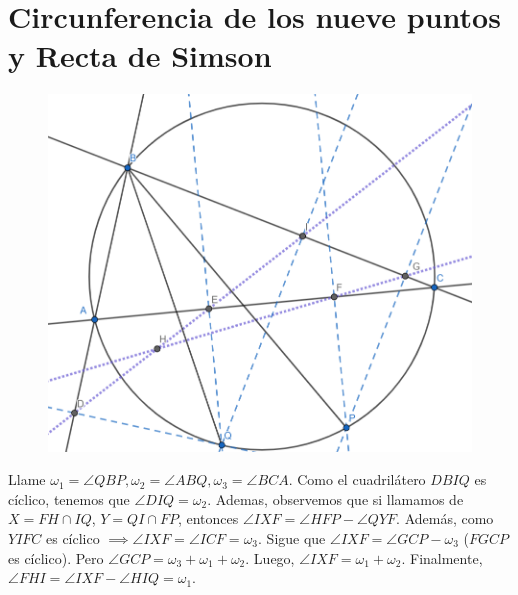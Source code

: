 \section{Circunferencia de los nueve puntos y Recta de Simson}

\begin{sol}
	
	\begin{figure}[h!]
		\centering
		\includegraphics[scale=0.4]{Imgs/JT5.png}
	\end{figure}
	Llame $\omega_{1} = \angle QBP, \omega_{2} = \angle ABQ, \omega_{3} = \angle BCA$. Como el cuadril\'atero $DBIQ$ es c\'iclico, tenemos que $\angle DIQ = \omega_{2}$. Ademas, observemos que si llamamos de $X = FH \cap IQ$, $Y = QI \cap FP$, entonces $\angle IXF = \angle HFP - \angle QYF$. Adem\'as, como $YIFC$ es c\'iclico $\implies \angle IXF = \angle ICF = \omega_{3}$. Sigue que $\angle IXF = \angle GCP - \omega_{3}$ ($FGCP$ es c\'iclico). Pero $\angle GCP = \omega_{3} + \omega_{1} + \omega_{2}$. Luego, $\angle IXF = \omega_{1} + \omega_{2}$. Finalmente, $\angle FHI = \angle IXF - \angle HIQ = \omega_{1}$. 
\end{sol}

